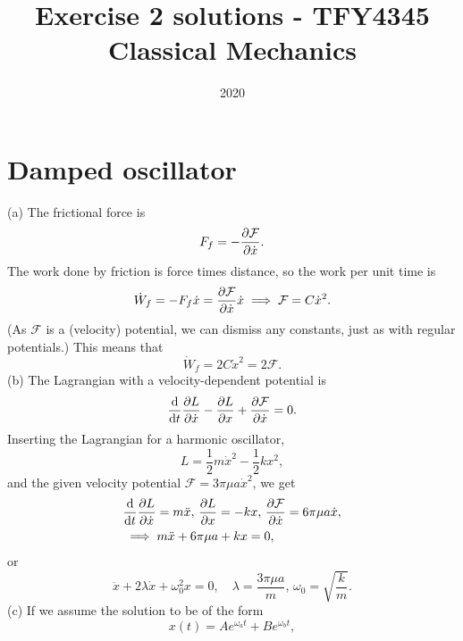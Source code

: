 \documentclass{article}
\title{Exercise 2 solutions - TFY4345 Classical Mechanics}
\date{2020}
\newcommand{\Eff}{\mathcal{F}}
\begin{document}
    \maketitle
    \section{Damped oscillator}
        (a) The frictional force is 
        \begin{equation*}
            F_f = -\pdv{\mathcal{F}}{\dot x}.
        \end{equation*}
        The work done by friction is force times distance, so the work per unit time is
        \begin{equation*}
            \dot W_f = - F_f \dot x = \pdv{\mathcal{F}}{\dot x} \dot x \implies \mathcal{F} = C \dot x ^2.
        \end{equation*}
        (As $\mathcal{F}$ is a (velocity) potential, we can dismiss any constants, just as with regular potentials.) This means that
        \begin{equation*}
            \dot W_f = 2 C \dot x^2 = 2 \mathcal{F}. 
        \end{equation*}
        (b) The Lagrangian with a velocity-dependent potential is 
        \begin{equation*}
            \dv{t} \pdv{L}{\dot x} - \pdv{L}{x} + \pdv{\Eff}{\dot x} = 0.
        \end{equation*}
        Inserting the Lagrangian for a harmonic oscillator, 
        \begin{equation*}
            L = \frac{1}{2} m \dot x^2 - \frac{1}{2} k x^2,
        \end{equation*}
        and the given velocity potential $\Eff = 3 \pi \mu a \dot x^2$, we get
        \begin{align*}
            &\dv{t} \pdv{L}{\dot x} = m \ddot x, \, \pdv{L}{x} = -k x, \, \pdv{\Eff}{\dot x} = 6 \pi \mu a \dot x, \\
            &\implies m \ddot x + 6 \pi \mu a + k x = 0,
        \end{align*}
        or
        \begin{equation*}
            \ddot x + 2 \lambda \dot x + \omega^2_0x = 0, \quad \lambda = \frac{3 \pi \mu a}{m}, \, \omega_0 = \sqrt{\frac{k}{m}}.
        \end{equation*}
        (c) 
        If we assume the solution to be of the form
        \begin{equation*}
            x(t) = A e^{\omega_a t} + B e^{\omega_b t},
        \end{equation*}
\end{document}
